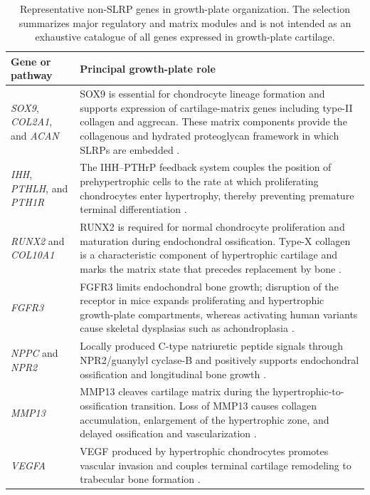 \begin{table}[H]
\centering
\caption{Representative non-SLRP genes in growth-plate organization. The
selection summarizes major regulatory and matrix modules and is not intended
as an exhaustive catalogue of all genes expressed in growth-plate cartilage.}
\label{tab:growth-plate-nonslrp}
\begin{tabularx}{\textwidth}{@{}p{}X@{}}
\toprule
Gene or pathway & Principal growth-plate role \\
\midrule
\textit{SOX9}, \textit{COL2A1}, and \textit{ACAN} &
SOX9 is essential for chondrocyte lineage formation and supports expression of
cartilage-matrix genes including type-II collagen and aggrecan. These matrix
components provide the collagenous and hydrated proteoglycan framework in
which SLRPs are embedded \citep{Bi1999Sox9}. \\
\textit{IHH}, \textit{PTHLH}, and \textit{PTH1R} &
The IHH--PTHrP feedback system couples the position of prehypertrophic cells to
the rate at which proliferating chondrocytes enter hypertrophy, thereby
preventing premature terminal differentiation \citep{Vortkamp1996IhhPthrp}. \\
\textit{RUNX2} and \textit{COL10A1} &
RUNX2 is required for normal chondrocyte proliferation and maturation during
endochondral ossification. Type-X collagen is a characteristic component of
hypertrophic cartilage and marks the matrix state that precedes replacement by
bone \citep{Chen2014Runx2}. \\
\textit{FGFR3} &
FGFR3 limits endochondral bone growth; disruption of the receptor in mice
expands proliferating and hypertrophic growth-plate compartments, whereas
activating human variants cause skeletal dysplasias such as achondroplasia
\citep{Deng1996Fgfr3}. \\
\textit{NPPC} and \textit{NPR2} &
Locally produced C-type natriuretic peptide signals through NPR2/guanylyl
cyclase-B and positively supports endochondral ossification and longitudinal
bone growth \citep{Tamura2004Npr2}. \\
\textit{MMP13} &
MMP13 cleaves cartilage matrix during the hypertrophic-to-ossification
transition. Loss of MMP13 causes collagen accumulation, enlargement of the
hypertrophic zone, and delayed ossification and vascularization
\citep{Inada2004Mmp13}. \\
\textit{VEGFA} &
VEGF produced by hypertrophic chondrocytes promotes vascular invasion and
couples terminal cartilage remodeling to trabecular bone formation
\citep{Gerber1999Vegf}. \\
\bottomrule
\end{tabularx}
\end{table}

